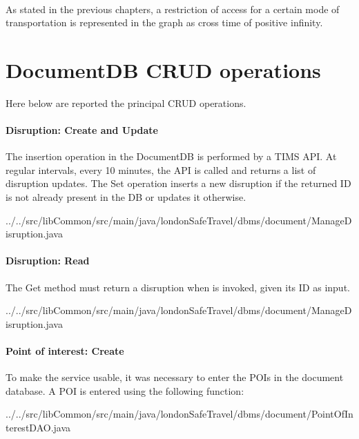 \paragraph{}
As stated in the previous chapters, a restriction of access for a certain mode of transportation is represented in the graph as cross time of positive infinity.


\section{DocumentDB CRUD operations}
Here below are reported the principal CRUD operations.

\paragraph{Disruption: Create and Update}
The insertion operation in the DocumentDB is performed by a TIMS API. At regular intervals, every 10 minutes, the API is called and returns a list of disruption updates. The Set operation inserts a new disruption if the returned ID is not already present in the DB or updates it otherwise.

{../../src/libCommon/src/main/java/londonSafeTravel/dbms/document/ManageDisruption.java}

\paragraph{Disruption: Read}
The Get method must return a disruption when is invoked, given its ID as input.

{../../src/libCommon/src/main/java/londonSafeTravel/dbms/document/ManageDisruption.java}

\paragraph{Point of interest: Create}
To make the service usable, it was necessary to enter the POIs in the document database. A POI is entered using the following function:


{../../src/libCommon/src/main/java/londonSafeTravel/dbms/document/PointOfInterestDAO.java}